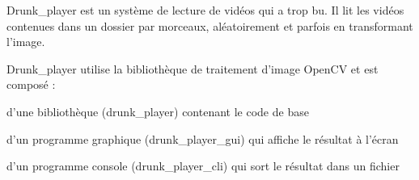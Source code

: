 Drunk\+\_\+player est un système de lecture de vidéos qui a trop bu. Il lit les vidéos contenues dans un dossier par morceaux, aléatoirement et parfois en transformant l'image.

Drunk\+\_\+player utilise la bibliothèque de traitement d'image Open\+C\+V et est composé \+:


\begin{DoxyItemize}
\item d'une bibliothèque (drunk\+\_\+player) contenant le code de base
\item d'un programme graphique (drunk\+\_\+player\+\_\+gui) qui affiche le résultat à l'écran
\item d'un programme console (drunk\+\_\+player\+\_\+cli) qui sort le résultat dans un fichier 
\end{DoxyItemize}
